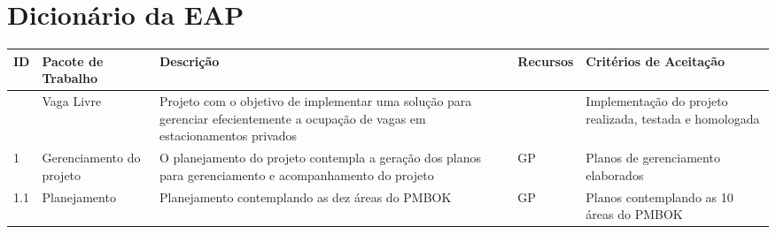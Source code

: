 
\chapter{Dicionário da EAP}
\label{ch:wbs-dictionary}

\begin{longtable}{  l  p{}  p{}  p{}  p{}  }
	\toprule
	\textbf{ID} & \textbf{Pacote de Trabalho}                               & \textbf{Descrição}                                                                                                                                                             & \textbf{Recursos}                                                                                & \textbf{Critérios de Aceitação}                                                                       \\
	\midrule
	            & Vaga Livre                                                & Projeto com o objetivo de implementar uma solução para gerenciar efecientemente a ocupação de vagas em estacionamentos privados                                              &                                                                                                  & Implementação do projeto realizada, testada e homologada                                               \\*
	\midrule
	1           & Gerenciamento do projeto                                  & O planejamento do projeto contempla a geração dos planos para gerenciamento e acompanhamento do projeto                                                                        & GP                                                                                               & Planos de gerenciamento elaborados                                                                       \\*
	\midrule
	1.1         & Planejamento                                              & Planejamento contemplando as dez áreas do PMBOK                                                                                                                                 & GP                                                                                               & Planos contemplando as 10 áreas do PMBOK                                                                \\*
	\midrule

\end{longtable}
